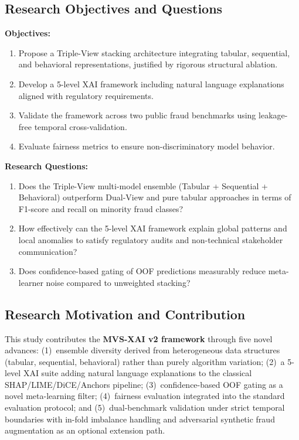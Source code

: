\documentclass[10pt,a4paper,twocolumn]{article}
\begin{document}
\subsection{Research Objectives and Questions}
\textbf{Objectives:}
\begin{enumerate}
    \item Propose a Triple-View stacking architecture integrating tabular, sequential, and behavioral representations, justified by rigorous structural ablation.
    \item Develop a 5-level XAI framework including natural language explanations aligned with regulatory requirements.
    \item Validate the framework across two public fraud benchmarks using leakage-free temporal cross-validation.
    \item Evaluate fairness metrics to ensure non-discriminatory model behavior.
\end{enumerate}

\textbf{Research Questions:}
\begin{enumerate}
    \item Does the Triple-View multi-model ensemble (Tabular + Sequential + Behavioral) outperform Dual-View and pure tabular approaches in terms of F1-score and recall on minority fraud classes?
    \item How effectively can the 5-level XAI framework explain global patterns and local anomalies to satisfy regulatory audits and non-technical stakeholder communication?
    \item Does confidence-based gating of OOF predictions measurably reduce meta-learner noise compared to unweighted stacking?
\end{enumerate}

\subsection{Research Motivation and Contribution}
This study contributes the \textbf{MVS-XAI v2 framework} through five novel advances: (1)~ensemble diversity derived from heterogeneous data structures (tabular, sequential, behavioral) rather than purely algorithm variation; (2)~a 5-level XAI suite adding natural language explanations to the classical SHAP/LIME/DiCE/Anchors pipeline; (3)~confidence-based OOF gating as a novel meta-learning filter; (4)~fairness evaluation integrated into the standard evaluation protocol; and (5)~dual-benchmark validation under strict temporal boundaries with in-fold imbalance handling and adversarial synthetic fraud augmentation as an optional extension path.
\end{document}
